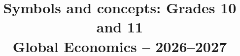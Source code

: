 



\usepackage{needspace}
\HighlightViewerLongtableFix
\GTenHighlightstrue
\geometry{a3paper,margin=20mm}
\raggedbottom
\setcounter{tocdepth}{2}
\title{Symbols and concepts: Grades 10 and 11\\[0.5em]
  \large Global Economics -- 2026--2027}
\author{}
\date{}
\newcommand{\PreviewLegend}[2]{%
  \Needspace{12\baselineskip}%
  \subsubsection*{#2}
  \noindent\textbf{Registry key:} \texttt{#1}\par\nobreak
  \begingroup
  \PracticeHighlightLegend{#1}%
  \endgroup
}
\newcommand{\PreviewBackToContents}{%
  \par\smallskip\hyperref[preview:contents]{Back to contents}\par
}

\newcommand{\PreviewSection}[2]{%
  \clearpage\Needspace{18\baselineskip}\section{#2}\label{#1}\nobreak}
\newcommand{\PreviewSubsection}[2]{%
  \Needspace{14\baselineskip}\subsection{#2}\label{#1}\nobreak}
\newcommand{\PreviewFullTerm}[2]{%
  \PreviewSubsection{preview:g#1t#2-full}{Full Term Reference}
  \SpecificHighlightUnion{#1}{#2}{detailed}\PreviewBackToContents}
\newcommand{\PreviewPending}{Reference not yet available.\PreviewBackToContents}
\newcommand{\PreviewTenTone}[2]{%
  \PreviewSubsection{preview:g10t1-#1}{#2}
  \begingroup\GTenToneReference{#1}\endgroup\PreviewBackToContents}
\newcommand{\PreviewElevenTone}[2]{%
  \PreviewSubsection{preview:g11t1-#1}{#2}
  \begingroup
  \PracticeHighlightLegend{G11-T1-#1}
  \Needspace{10\baselineskip}
  \subsubsection*{Definitions and introductory meanings}\nobreak
  \COneToneDetailedReference{#2}\endgroup\PreviewBackToContents}

